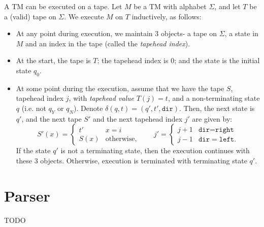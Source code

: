 A TM can be executed on a tape. Let $M$ be a TM with alphabet $\Sigma$, and let $T$ be a (valid) tape on $\Sigma$. We execute $M$ on $T$ inductively, as follows:
\begin{itemize}
    \item At any point during execution, we maintain 3 objects- a tape on $\Sigma$, a state in $M$ and an index in the tape (called the \emph{tapehead index}). 
    \item At the start, the tape is $T$; the tapehead index is $0$; and the state is the initial state $q_0$. 
    \item At some point during the execution, assume that we have the tape $S$, tapehead index $j$, with \emph{tapehead value} $T(j) = t$, and a non-terminating state $q$ (i.e. not $q_Y$ or $q_N$). Denote $\delta(q, t) = (q', t', \texttt{dir})$. Then, the next state is $q'$, and the next tape $S'$ and the next tapehead index $j'$ are given by:
    \[S'(x) = \begin{cases}
        t' & x = i \\
        S(x) & \text{otherwise},
    \end{cases} \qquad j' = \begin{cases}
        j+1 & \texttt{dir} = \texttt{right} \\
        j-1 & \texttt{dir} = \texttt{left}.
    \end{cases}\]
    If the state $q'$ is not a terminating state, then the execution continues with these 3 objects. Otherwise, execution is terminated with terminating state $q'$.
\end{itemize}

\section{Parser}
TODO
